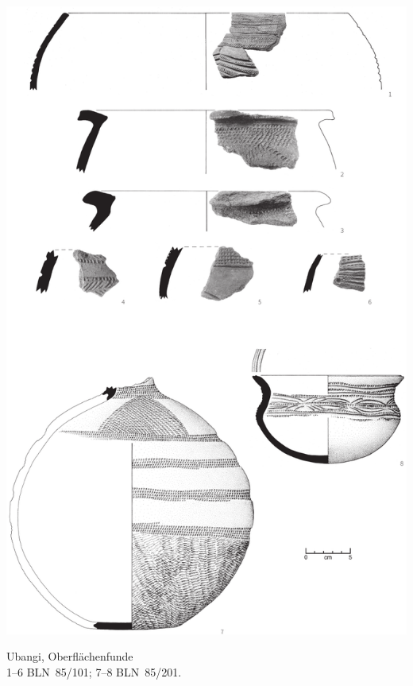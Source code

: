 \begin{pl}[H]
	\includegraphics{plt/Taf20.pdf}
	\vspace{.75em}\caption{\mbox{Ubangi}, Oberflächenfunde \\ 1--6 BLN~85/101; 7--8 BLN~85/201.}
	\label{pl:20}
\end{pl}

